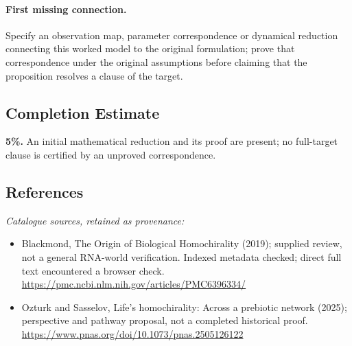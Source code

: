 \documentclass[11pt]{article}
\begin{document}
\paragraph{First missing connection.} Specify an observation map, parameter correspondence or dynamical reduction connecting this worked model to the original formulation; prove that correspondence under the original assumptions before claiming that the proposition resolves a clause of the target.
\subsection{Completion Estimate}
\textbf{5\%.} An initial mathematical reduction and its proof are present; no full-target clause is certified by an unproved correspondence.
\subsection{References}
\noindent\emph{Catalogue sources, retained as provenance:}
\begin{itemize}
\item Blackmond, The Origin of Biological Homochirality (2019); supplied review, not a general RNA-world verification. Indexed metadata checked; direct full text encountered a browser check. \url{https://pmc.ncbi.nlm.nih.gov/articles/PMC6396334/}
\item Ozturk and Sasselov, Life's homochirality: Across a prebiotic network (2025); perspective and pathway proposal, not a completed historical proof. \url{https://www.pnas.org/doi/10.1073/pnas.2505126122}
\end{itemize}
\clearpage


\appendix
\end{document}
